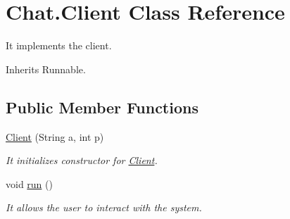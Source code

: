 \hypertarget{class_chat_1_1_client}{}\section{Chat.\+Client Class Reference}
\label{class_chat_1_1_client}


It implements the client.  




Inherits Runnable.

\subsection*{Public Member Functions}
\begin{DoxyCompactItemize}
\item 
\hyperlink{class_chat_1_1_client_a4b7e710445daa791b57d2345ebc97b1e}{Client} (String a, int p)
\begin{DoxyCompactList}\small\item\em It initializes constructor for \hyperlink{class_chat_1_1_client}{Client}. \end{DoxyCompactList}\item 
\mbox{\label{class_chat_1_1_client_af929f8bd324136e11afe64c92fa1cac3}} 
void \hyperlink{class_chat_1_1_client_af929f8bd324136e11afe64c92fa1cac3}{run} ()
\begin{DoxyCompactList}\small\item\em It allows the user to interact with the system. \end{DoxyCompactList}\end{DoxyCompactItemize}
